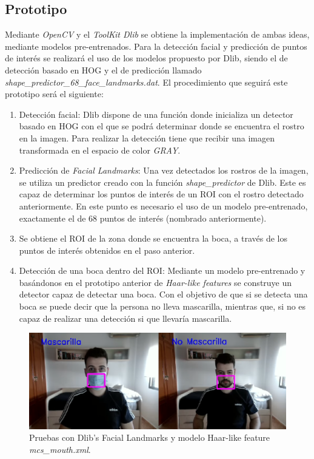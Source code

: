 \vspace{-0.8cm}
\subsection*{Prototipo}
\vspace{-0.5cm}
Mediante \textit{OpenCV} y el \textit{ToolKit Dlib} se obtiene la implementación de ambas ideas, mediante modelos pre-entrenados. Para la detección facial y predicción de puntos de interés se realizará el uso de los modelos propuesto por Dlib, siendo el de detección basado en HOG y el de predicción llamado \textit{shape\_predictor\_68\_face\_landmarks.dat}. El procedimiento que seguirá este prototipo será el siguiente:

\begin{enumerate}
	\item Detección facial: Dlib dispone de una función donde inicializa un detector basado en HOG con el que se podrá determinar donde se encuentra el rostro en la imagen. Para realizar la detección tiene que recibir una imagen transformada en el espacio de color \textit{GRAY}.
	\item Predicción de \textit{Facial Landmarks}: Una vez detectados los rostros de la imagen, se utiliza un predictor creado con la función \textit{shape\_predictor} de Dlib. Este es capaz de determinar los puntos de interés de un ROI con el rostro detectado anteriormente. En este punto es necesario el uso de un modelo pre-entrenado, exactamente el de 68 puntos de interés (nombrado anteriormente).
	\item Se obtiene el ROI de la zona donde se encuentra la boca, a través de los puntos de interés obtenidos en el paso anterior.
	\item Detección de una boca dentro del ROI: Mediante un modelo pre-entrenado y basándonos en el prototipo anterior de \textit{Haar-like features} se construye un detector capaz de detectar una boca. Con el objetivo de que si se detecta una boca se puede decir que la persona no lleva mascarilla, mientras que, si no es capaz de realizar una detección si que llevaría mascarilla.
\end{enumerate}

\begin{figure}[htp]
	\centering
	\includegraphics[width=12cm]{imagenes/landmark_prueba.png}
	\caption{Pruebas con Dlib's Facial Landmarks y modelo Haar-like feature \textit{mcs\_mouth.xml}.}
	\label{fig:dlibLandmarks}
\end{figure}

